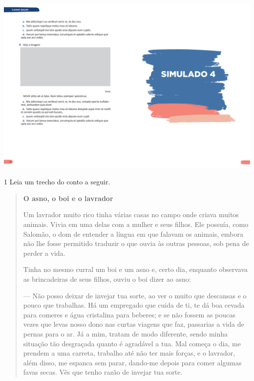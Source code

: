 \vspace*{-3.4cm}
\hspace*{-3.7cm}\includegraphics[scale=1]{../watermarks/4simulado5ano.pdf}

\num{1} Leia um trecho do conto a seguir.

\begin{quote}
\textbf{O asno, o boi e o lavrador}

Um lavrador muito rico tinha várias casas no campo onde criava muitos
animais. Vivia em uma delas com a mulher e seus filhos. Ele possuía,
como Salomão, o dom de entender a língua em que falavam os animais,
embora não lhe fosse permitido traduzir o que ouvia às outras pessoas,
sob pena de perder a vida.

Tinha no mesmo curral um boi e um asno e, certo dia, enquanto observava
as brincadeiras de seus filhos, ouviu o boi dizer ao asno:

--- Não posso deixar de invejar tua sorte, ao ver o muito que descansas e
o pouco que trabalhas. Há um empregado que cuida de ti, te dá boa cevada
para comeres e água cristalina para beberes; e se não fossem as poucas
vezes que levas nosso dono nas curtas viagens que faz, passarias a vida
de pernas para o ar. Já a mim, tratam de modo diferente, sendo minha
situação tão desgraçada quanto é agradável a tua. Mal começa o dia, me
prendem a uma carreta, trabalho até não ter mais forças, e o lavrador,
além disso, me espanca sem parar, dando-me depois para comer algumas
favas secas. Vês que tenho razão de invejar tua sorte.

\end{quote}

